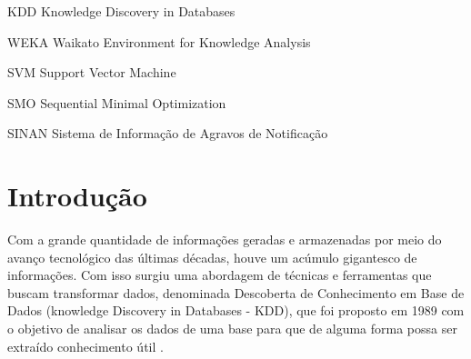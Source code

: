 \documentclass[
	12pt,				%
	openright,			%
	oneside,	
	a4paper,				%
	english,				%
	brazil				%
]{abntex2/abntex2} %
\begin{document}



 

\listoffigures*
\cleardoublepage

\listoftables*
\cleardoublepage

\begin{siglas}
  \item[KDD] Knowledge Discovery in Databases
  \item[WEKA] Waikato Environment for Knowledge Analysis
  \item[SVM] Support Vector Machine
  \item[SMO] Sequential Minimal Optimization
  \item[SINAN] Sistema de Informação de Agravos de Notificação
\end{siglas}




\tableofcontents*
\cleardoublepage

\textual

\chapter{Introdução}

	Com a grande quantidade de informações geradas e armazenadas por meio do avanço tecnológico das últimas décadas, houve um acúmulo gigantesco de informações. Com isso surgiu uma abordagem de técnicas e ferramentas que buscam transformar dados, denominada Descoberta de Conhecimento em Base de Dados (knowledge Discovery in Databases - KDD), que foi proposto em 1989 com o objetivo de analisar os dados de uma base para que de alguma forma possa ser extraído conhecimento útil \cite{fayyad:1996}.	
	
\end{document}
